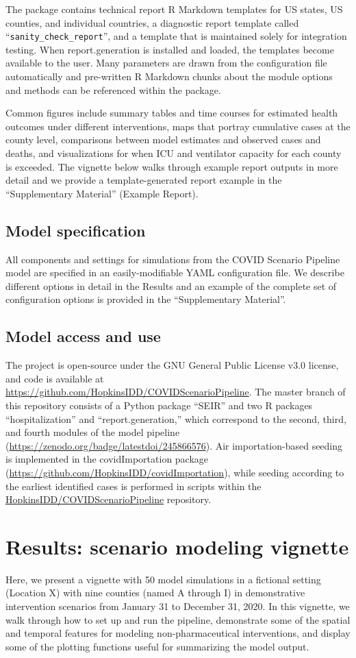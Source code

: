 The package contains technical report R Markdown templates for US states, US counties, and individual countries, a diagnostic report template called “\verb|sanity_check_report|”, and a template that is maintained solely for integration testing. When report.generation is installed and loaded, the templates become available to the user. Many parameters are drawn from the configuration file automatically and pre-written R Markdown chunks about the module options and methods can be referenced within the package.

Common figures include summary tables and time courses for estimated health outcomes under different interventions, maps that portray cumulative cases at the county level, comparisons between model estimates and observed cases and deaths, and visualizations for when ICU and ventilator capacity for each county is exceeded. The vignette below walks through example report outputs in more detail and we provide a template-generated report example in the “Supplementary Material” (Example Report).

\subsection{Model specification}
All components and settings for simulations from the COVID Scenario Pipeline model are specified in an easily-modifiable YAML configuration file. We describe different options in detail in the Results and an example of the complete set of configuration options is provided in the “Supplementary Material”.

\subsection{Model access and use}
The project is open-source under the GNU General Public License v3.0 license, and code is available at \url{https://github.com/HopkinsIDD/COVIDScenarioPipeline}. The master branch of this repository consists of a Python package “SEIR” and two R packages “hospitalization” and “report.generation,” which correspond to the second, third, and fourth modules of the model pipeline (\url{https://zenodo.org/badge/latestdoi/245866576}). Air importation-based seeding is implemented in the covidImportation package (\url{https://github.com/HopkinsIDD/covidImportation}), while seeding according to the earliest identified cases is performed in scripts within the \url{HopkinsIDD/COVIDScenarioPipeline} repository.

\section{Results: scenario modeling vignette}
Here, we present a vignette with 50 model simulations in a fictional setting (Location X) with nine counties (named A through I) in demonstrative intervention scenarios from January 31 to December 31, 2020. In this vignette, we walk through how to set up and run the pipeline, demonstrate some of the spatial and temporal features for modeling non-pharmaceutical interventions, and display some of the plotting functions useful for summarizing the model output.

